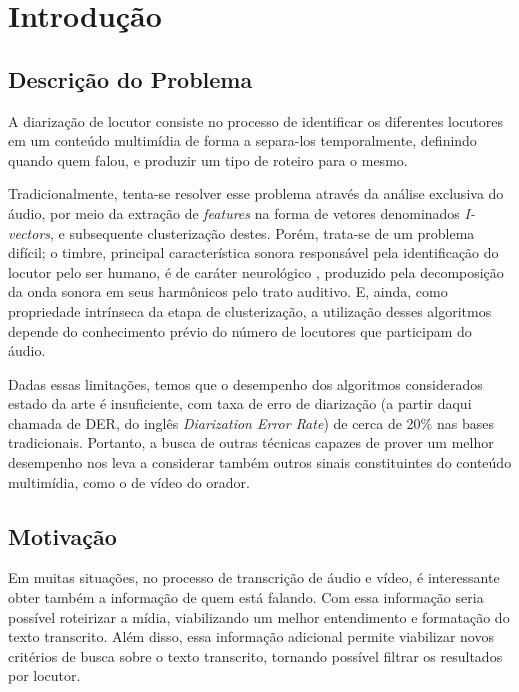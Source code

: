 \chapter{Introdução}
\label{chap:intro}

\section{Descrição do Problema}
\label{sec:desc}

A diarização de locutor consiste no processo de identificar os diferentes locutores em um conteúdo multimídia de forma a separa-los temporalmente, definindo quando quem falou, e produzir um tipo de roteiro para o mesmo.

Tradicionalmente, tenta-se resolver esse problema através da análise exclusiva do áudio, por meio da extração de \textit{features} na forma de vetores denominados \textit{I-vectors}\cite{zewoudieUseLongtermFeatures2018}, e subsequente clusterização destes.
Porém, trata-se de um problema difícil; o timbre, principal característica sonora responsável pela identificação do locutor pelo ser humano, é de caráter neurológico \cite{oxenhamPitchPerception2012}, produzido pela decomposição da onda sonora em seus harmônicos pelo trato auditivo.
E, ainda, como propriedade intrínseca da etapa de clusterização, a utilização desses algoritmos depende do conhecimento prévio do número de locutores que participam do áudio.

Dadas essas limitações, temos que o desempenho dos algoritmos considerados estado da arte é insuficiente, com taxa de erro de diarização (a partir daqui chamada de DER, do inglês \textit{Diarization Error Rate}) de cerca de 20\% nas bases tradicionais.
Portanto, a busca de outras técnicas capazes de prover um melhor desempenho nos leva a considerar também outros sinais constituintes do conteúdo multimídia, como o de vídeo do orador.

\section{Motivação}
\label{sec:motiv}

Em muitas situações, no processo de transcrição de áudio e vídeo, é interessante obter também a informação de quem está falando.
Com essa informação seria possível roteirizar a mídia, viabilizando um melhor entendimento e formatação do texto transcrito.
Além disso, essa informação adicional permite viabilizar novos critérios de busca sobre o texto transcrito, tornando possível filtrar os resultados por locutor.

